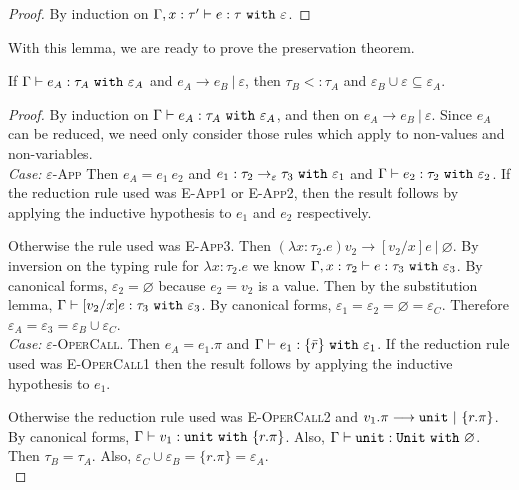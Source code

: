 \begin{proof} By induction on $\Gamma, x: \tau' \vdash e: \tau~\mathtt{with}~ \varepsilon$.
\end{proof}

With this lemma, we are ready to prove the preservation theorem.

\begin{theorem}[Preservation]
If $\Gamma \vdash e_A: \tau_A~\mathtt{with}~ \varepsilon_A$ and $e_A \longrightarrow e_B~|~\varepsilon$, then $\tau_B <: \tau_A$ and $\varepsilon_B \cup \varepsilon \subseteq \varepsilon_A$.
\end{theorem}

\begin{proof} By induction on $\Gamma \vdash e_A: \tau_A~\mathtt{with}~ \varepsilon_A$, and then on $e_A \longrightarrow e_B~|~\varepsilon$. Since $e_A$ can be reduced, we need only consider those rules which apply to non-values and non-variables. \\

\textit{Case:} \textsc{$\varepsilon$-App} Then $e_A = e_1 ~ e_2$ and $e_1: \tau_2 \rightarrow_{\varepsilon} \tau_3~\mathtt{with}~ \varepsilon_1$ and $\Gamma \vdash e_2: \tau_2~\mathtt{with}~ \varepsilon_2$. If the reduction rule used was \textsc{E-App1} or \textsc{E-App2}, then the result follows by applying the inductive hypothesis to $e_1$ and $e_2$ respectively.

Otherwise the rule used was \textsc{E-App3}. Then $(\lambda x: \tau_2. e) v_2 \longrightarrow [ v_2/x] e~|~\varnothing$. By inversion on the typing rule for $\lambda x:  \tau_2. e$ we know $\Gamma, x:  \tau_2 \vdash  e:  \tau_3~\mathtt{with}~ \varepsilon_3$. By canonical forms, $\varepsilon_2 = \varnothing$ because $ e_2 =  v_2$ is a value. Then by the substitution lemma, $ \Gamma \vdash [ v_2/x] e :  \tau_3~\mathtt{with}~ \varepsilon_3$. By canonical forms, $\varepsilon_1 = \varepsilon_2 = \varnothing = \varepsilon_C$. Therefore $\varepsilon_A = \varepsilon_3 = \varepsilon_B \cup \varepsilon_C$.\\

\textit{Case:} \textsc{$\varepsilon$-OperCall}. Then $e_A = e_1.\pi$ and $ \Gamma \vdash e_1 : \{ \bar r \}~\mathtt{with}~ \varepsilon_1$. If the reduction rule used was \textsc{E-OperCall1} then the result follows by applying the inductive hypothesis to $ e_1$.

Otherwise the reduction rule used was \textsc{E-OperCall2} and $v_1.\pi \longrightarrow \mathtt{unit}~|~\{ r.\pi \}$. By canonical forms, $ \Gamma \vdash v_1: \mathtt{unit}~\mathtt{with}~ \{ r.\pi \}$. Also, $ \Gamma \vdash \mathtt{unit}: \mathtt{Unit}~\mathtt{with}~ \varnothing$. Then $\tau_B = \tau_A$. Also, $\varepsilon_C \cup \varepsilon_B = \{ r.\pi \} = \varepsilon_A$.\\

\end{proof}

